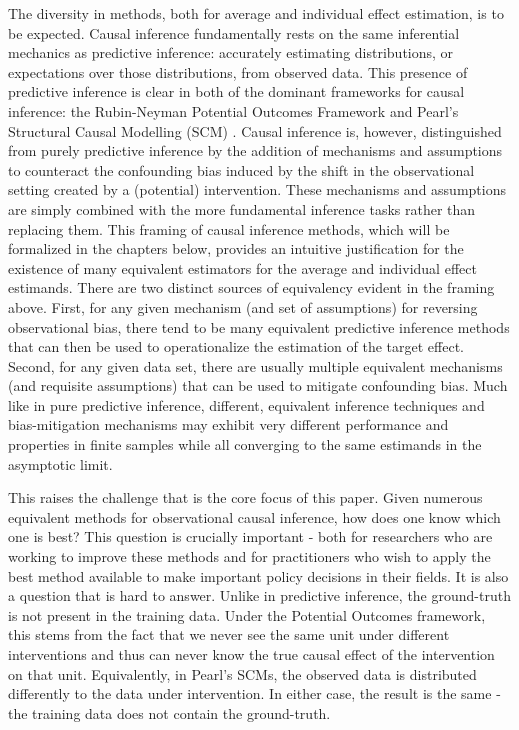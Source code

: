\documentclass[../main.tex]{subfiles}
\begin{document}
\vspace{\baselineskip}

The diversity in methods, both for average and individual effect estimation, is to be expected. Causal inference fundamentally rests on the same inferential mechanics as predictive inference: accurately estimating distributions, or expectations over those distributions, from observed data. This presence of predictive inference is clear in both of the dominant frameworks for causal inference: the Rubin-Neyman Potential Outcomes Framework \parencite{Holland1986StatisticsInference} and Pearl’s Structural Causal Modelling (SCM) \parencite{Pearl2009CausalOverview}. Causal inference is, however, distinguished from purely predictive inference by the addition of mechanisms and assumptions to counteract the confounding bias induced by the shift in the observational setting created by a (potential) intervention. These mechanisms and assumptions are simply combined with the more fundamental inference tasks rather than replacing them. This framing of causal inference methods, which will be formalized in the chapters below, provides an intuitive justification for the existence of many equivalent estimators for the average and individual effect estimands. There are two distinct sources of equivalency evident in the framing above. First, for any given mechanism (and set of assumptions) for reversing observational bias, there tend to be many equivalent predictive inference methods that can then be used to operationalize the estimation of the target effect. Second, for any given data set, there are usually multiple equivalent mechanisms (and requisite assumptions) that can be used to mitigate confounding bias. Much like in pure predictive inference, different, equivalent inference techniques and bias-mitigation mechanisms may exhibit very different performance and properties in finite samples while all converging to the same estimands in the asymptotic limit.\par


\vspace{\baselineskip}
This raises the challenge that is the core focus of this paper. Given numerous equivalent methods for observational causal inference, how does one know which one is best? This question is crucially important - both for researchers who are working to improve these methods and for practitioners who wish to apply the best method available to make important policy decisions in their fields. It is also a question that is hard to answer. Unlike in predictive inference, the ground-truth is not present in the training data. Under the Potential Outcomes framework, this stems from the fact that we never see the same unit under different interventions and thus can never know the true causal effect of the intervention on that unit. Equivalently, in Pearl’s SCMs, the observed data is distributed differently to the data under intervention. In either case, the result is the same - the training data does not contain the ground-truth. 
\end{document}
